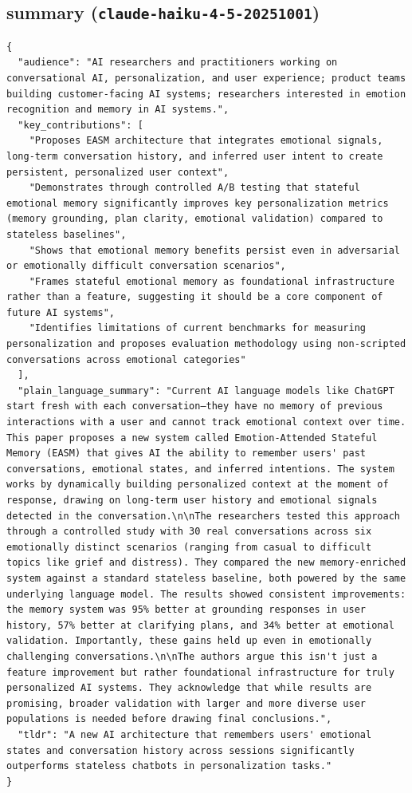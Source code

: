 \documentclass[11pt]{article}
\begin{document}
\subsection*{summary (\texttt{claude-haiku-4-5-20251001})}
\begin{verbatim}
{
  "audience": "AI researchers and practitioners working on conversational AI, personalization, and user experience; product teams building customer-facing AI systems; researchers interested in emotion recognition and memory in AI systems.",
  "key_contributions": [
    "Proposes EASM architecture that integrates emotional signals, long-term conversation history, and inferred user intent to create persistent, personalized user context",
    "Demonstrates through controlled A/B testing that stateful emotional memory significantly improves key personalization metrics (memory grounding, plan clarity, emotional validation) compared to stateless baselines",
    "Shows that emotional memory benefits persist even in adversarial or emotionally difficult conversation scenarios",
    "Frames stateful emotional memory as foundational infrastructure rather than a feature, suggesting it should be a core component of future AI systems",
    "Identifies limitations of current benchmarks for measuring personalization and proposes evaluation methodology using non-scripted conversations across emotional categories"
  ],
  "plain_language_summary": "Current AI language models like ChatGPT start fresh with each conversation—they have no memory of previous interactions with a user and cannot track emotional context over time. This paper proposes a new system called Emotion-Attended Stateful Memory (EASM) that gives AI the ability to remember users' past conversations, emotional states, and inferred intentions. The system works by dynamically building personalized context at the moment of response, drawing on long-term user history and emotional signals detected in the conversation.\n\nThe researchers tested this approach through a controlled study with 30 real conversations across six emotionally distinct scenarios (ranging from casual to difficult topics like grief and distress). They compared the new memory-enriched system against a standard stateless baseline, both powered by the same underlying language model. The results showed consistent improvements: the memory system was 95% better at grounding responses in user history, 57% better at clarifying plans, and 34% better at emotional validation. Importantly, these gains held up even in emotionally challenging conversations.\n\nThe authors argue this isn't just a feature improvement but rather foundational infrastructure for truly personalized AI systems. They acknowledge that while results are promising, broader validation with larger and more diverse user populations is needed before drawing final conclusions.",
  "tldr": "A new AI architecture that remembers users' emotional states and conversation history across sessions significantly outperforms stateless chatbots in personalization tasks."
}
\end{verbatim}
\end{document}

